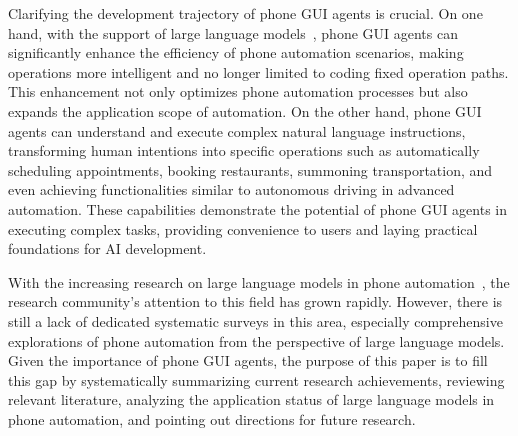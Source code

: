 Clarifying the development trajectory of phone GUI agents is crucial. On one hand, with the support of large language models~\cite{radford2018gpt1,radford2019gpt2,brown2020gpt3,achiam2023gpt}, phone GUI agents can significantly enhance the efficiency of phone automation scenarios, making operations more intelligent and no longer limited to coding fixed operation paths. This enhancement not only optimizes phone automation processes but also expands the application scope of automation. On the other hand, phone GUI agents can understand and execute complex natural language instructions, transforming human intentions into specific operations such as automatically scheduling appointments, booking restaurants, summoning transportation, and even achieving functionalities similar to autonomous driving in advanced automation. These capabilities demonstrate the potential of phone GUI agents in executing complex tasks, providing convenience to users and laying practical foundations for AI development.


With the increasing research on large language models in phone automation~\cite{wen2023droidbot,wen2024autodroid,wang2024mobileagentv1,wang2024mobileagentv2,liu2024vision,zhang2024mobileexperts,lu2024omniparser}, the research community's attention to this field has grown rapidly. However, there is still a lack of dedicated systematic surveys in this area, especially comprehensive explorations of phone automation from the perspective of large language models. Given the importance of phone GUI agents, the purpose of this paper is to fill this gap by systematically summarizing current research achievements, reviewing relevant literature, analyzing the application status of large language models in phone automation, and pointing out directions for future research.



